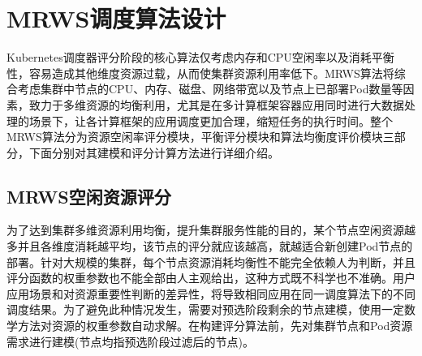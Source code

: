 \section{MRWS调度算法设计}
Kubernetes调度器评分阶段的核心算法仅考虑内存和CPU空闲率以及消耗平衡性，容易造成其他维度资源过载，从而使集群资源利用率低下。MRWS算法将综合考虑集群中节点的CPU、内存、磁盘、网络带宽以及节点上已部署Pod数量等因素，致力于多维资源的均衡利用，尤其是在多计算框架容器应用同时进行大数据处理的场景下，让各计算框架的应用调度更加合理，缩短任务的执行时间。整个MRWS算法分为资源空闲率评分模块，平衡评分模块和算法均衡度评价模块三部分，下面分别对其建模和评分计算方法进行详细介绍。

\subsection{MRWS空闲资源评分}
为了达到集群多维资源利用均衡，提升集群服务性能的目的，某个节点空闲资源越多并且各维度消耗越平均，该节点的评分就应该越高，就越适合新创建Pod节点的部署。针对大规模的集群，每个节点资源消耗均衡性不能完全依赖人为判断，并且评分函数的权重参数也不能全部由人主观给出，这种方式既不科学也不准确。用户应用场景和对资源重要性判断的差异性，将导致相同应用在同一调度算法下的不同调度结果。为了避免此种情况发生，需要对预选阶段剩余的节点建模，使用一定数学方法对资源的权重参数自动求解。在构建评分算法前，先对集群节点和Pod资源需求进行建模(节点均指预选阶段过滤后的节点)。
